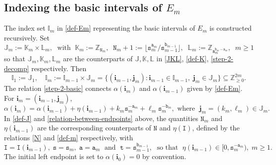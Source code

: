 \documentclass[12pt, twoside]{article}
\theoremstyle{definition}
\numberwithin{equation}{section}
\begin{document}
\subsection{Indexing the basic intervals of $E_m$} \label{indexing-section-1} 
The index set $\mathbb I_m$ in \eqref{def-Em} representing the basic intervals of $E_m$ is constructed recursively. Set
\begin{equation} 
 \mathbb J_m := \mathbb K_m \times \mathbb L_m, \; \text{ with } \; \mathbb K_m  := \mathbb Z_{\mathtt N_m}, \; \; \mathtt N_m + 1 := \lfloor \mathtt s_m^{\mathtt a_m}/\mathtt s_{m-1}^{\mathtt b_{m-1}}\rfloor, \; \; \mathbb L_m := \mathbb Z_{\mathtt s_m^{\mathtt b_m - \mathtt a_m}}, \; \; m\geq 1 \label{def-J} 
 \end{equation} 
 so that $\mathbb J_m, \mathbb K_m, \mathbb L_m$ are the counterparts of $\mathbb J, \mathbb K, \mathbb L$ in \eqref{JKL}, \eqref{def-K}, \eqref{step-2-decomp} respectively. Then 
 \begin{equation} 
 \mathbb I_1 := \mathbb J_1, \quad \mathbb I_m := \mathbb I_{m-1} \times \mathbb J_m = \bigl\{(\mathbf i_{m-1}, \mathbf j_m): \mathbf i_{m-1} \in \mathbb I_{m-1}, \; \mathbf j_m \in \mathbb J_m \bigr\} \subseteq \mathbb Z_{\geq 0}^{2m}. \label{def-I}
 \end{equation} 
The relation \eqref{step-2-basic} connects $\alpha(\mathbf i_m)$ and $\alpha(\mathbf i_{m-1})$ given by \eqref{def-Em}.
For $\mathbf i_m = (\mathbf i_{m-1}, \mathbf j_m)$,  
 \begin{equation} \label{relation-between-endpoints}
\alpha(\mathbf i_m) = \alpha(\mathbf i_{m-1}) + \eta(\mathbf i_{m-1}) + k_m \mathtt s_m^{-\mathtt a_m} + \ell_m \mathtt s_m^{-\mathtt b_m},  \text{ where } \; \mathbf j_m = (k_m, \ell_m) \in \mathbb J_m.        
\end{equation} 
In \eqref{def-J} and \eqref{relation-between-endpoints} above, the quantities $\mathtt N_m$ and $\eta(\mathbf i_{m-1})$ are the corresponding counterparts of $\mathtt N$ and $\eta(\mathtt I)$, defined by the relations \eqref{N} and \eqref{def-m} respectively, with 
\begin{equation} 
\mathtt I = \mathtt I (\mathbf i_{m-1}), \; \mathtt s = \mathtt s_m, \; \mathtt a = \mathtt a_m \; \text{ and } \; \mathtt t = \mathtt s_{m-1}^{\mathtt b_{m-1}}, \; \text{ so that } \; \eta(\mathbf i_{m-1}) \in \bigl[0, \mathtt s_m^{-\mathtt a_m} \bigr), \; m \geq 1.  \label{etaim}
\end{equation} 
The initial left endpoint is set to $\alpha(\mathbf i_0) = 0$ by convention. 
\end{document}
